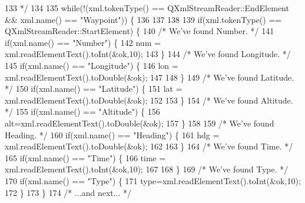 \begin{DoxyCode}
133 \textcolor{comment}{                     */}
134 
135                     \textcolor{keywordflow}{while}(!(xml.tokenType() == QXmlStreamReader::EndElement && xml.name() == \textcolor{stringliteral}{"Waypoint"})) \{
136 
137 
138 
139                         \textcolor{keywordflow}{if}(xml.tokenType() == QXmlStreamReader::StartElement) \{
140                             \textcolor{comment}{/* We've found Number. */}
141                             \textcolor{keywordflow}{if}(xml.name() == \textcolor{stringliteral}{"Number"}) \{
142                                 num = xml.readElementText().toInt(&ok,10);
143                             \}
144                             \textcolor{comment}{/* We've found Longitude. */}
145                             \textcolor{keywordflow}{if}(xml.name() == \textcolor{stringliteral}{"Longitude"}) \{
146                                 lon = xml.readElementText().toDouble(&ok);
147 
148                             \}
149                             \textcolor{comment}{/* We've found Latitude. */}
150                             \textcolor{keywordflow}{if}(xml.name() == \textcolor{stringliteral}{"Latitude"}) \{
151                                 lat = xml.readElementText().toDouble(&ok);
152 
153                             \}
154                             \textcolor{comment}{/* We've found Altitude. */}
155                             \textcolor{keywordflow}{if}(xml.name() == \textcolor{stringliteral}{"Altitude"}) \{
156                                 alt=xml.readElementText().toDouble(&ok);
157                             \}
158 
159                             \textcolor{comment}{/* We've found Heading. */}
160                             \textcolor{keywordflow}{if}(xml.name() == \textcolor{stringliteral}{"Heading"}) \{
161                                 hdg = xml.readElementText().toDouble(&ok);
162 
163                             \}
164                             \textcolor{comment}{/* We've found Time. */}
165                             \textcolor{keywordflow}{if}(xml.name() == \textcolor{stringliteral}{"Time"}) \{
166                                 time = xml.readElementText().toInt(&ok,10);
167 
168                            \}
169                             \textcolor{comment}{/* We've found Type. */}
170                             \textcolor{keywordflow}{if}(xml.name() == \textcolor{stringliteral}{"Type"}) \{
171                                 type=xml.readElementText().toInt(&ok,10);
172                             \}
173                         \}
174                         \textcolor{comment}{/* ...and next... */}

\end{DoxyCode}
